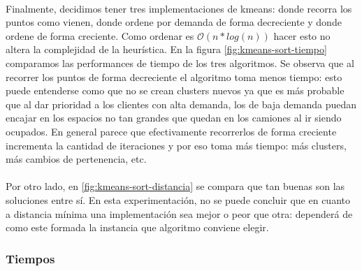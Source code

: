 \paragraph{}
Finalmente, decidimos tener tres implementaciones de kmeans: donde recorra los puntos como vienen, donde ordene por demanda de forma decreciente y donde ordene de forma creciente. Como ordenar es $\mathcal{O}(n*log(n))$ hacer esto no altera la complejidad de la heurística. En la figura \ref{fig:kmeans-sort-tiempo} comparamos las performances de tiempo de los tres algoritmos. Se observa que al recorrer los puntos de forma decreciente el algoritmo toma menos tiempo: esto puede entenderse como que no se crean clusters nuevos ya que es más probable que al dar prioridad a los clientes con alta demanda, los de baja demanda puedan encajar en los espacios no tan grandes que quedan en los camiones al ir siendo ocupados. En general parece que efectivamente recorrerlos de forma creciente incrementa la cantidad de iteraciones y por eso toma más tiempo: más clusters, más cambios de pertenencia, etc.
\paragraph{}
Por otro lado, en \ref{fig:kmeans-sort-distancia} se compara que tan buenas son las soluciones entre sí. En esta experimentación, no se puede concluir que en cuanto a distancia mínima una implementación sea mejor o peor que otra: dependerá de como este formada la instancia que algoritmo conviene elegir. 
\subsubsection{Tiempos}

